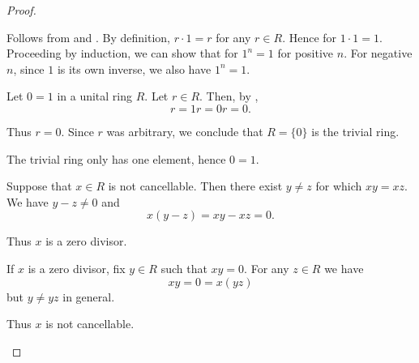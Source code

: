 \begin{proof}\mbox{}
  \begin{itemize}
     Follows from  and .
     By definition, \( r \cdot 1 = r \) for any \( r \in R \). Hence for \( 1 \cdot 1 = 1 \). Proceeding by induction\IND, we can show that for \( 1^n = 1 \) for positive \( n \). For negative \( n \), since \( 1 \) is its own inverse, we also have \( 1^n = 1 \).

    \mbox{}
    \begin{description}
      \Implies Let \( 0 = 1 \) in a unital ring \( R \). Let \( r \in R \). Then, by ,
      \begin{equation*}
        r = 1r = 0r = 0.
      \end{equation*}

      Thus \( r = 0 \). Since \( r \) was arbitrary, we conclude that \( R = \{ 0 \} \) is the trivial ring.

      \ImpliedBy The trivial ring only has one element, hence \( 0 = 1 \).
    \end{description}

    \mbox{}
    \begin{description}
      \Implies Suppose that \( x \in R \) is not cancellable. Then there exist \( y \neq z \) for which \( xy = xz \). We have \( y - z \neq 0 \) and
      \begin{equation*}
        x(y - z) = xy - xz = 0.
      \end{equation*}

      Thus \( x \) is a zero divisor.

      \ImpliedBy If \( x \) is a zero divisor, fix \( y \in R \) such that \( xy = 0 \). For any \( z \in R \) we have
      \begin{equation*}
        xy = 0 = x(yz)
      \end{equation*}
      but \( y \neq yz \) in general.

      Thus \( x \) is not cancellable.
    \end{description}
  \end{itemize}
\end{proof}

